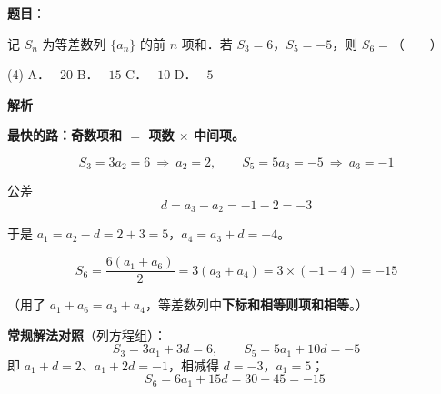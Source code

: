 \begin{answer}

\textbf{题目}：

记 $S_n$ 为等差数列 $\{a_n\}$ 的前 $n$ 项和．若 $S_3=6$，$S_5=-5$，则 $S_6=$\mbox{（　　）}

\begin{gkopts}(4)
\task A．$-20$
\task B．$-15$
\task C．$-10$
\task D．$-5$
\end{gkopts}

\textbf{解析}

\textbf{最快的路：奇数项和 $=$ 项数 $\times$ 中间项。}

\nopagebreak[4]
\[S_3=3a_2=6\ \Longrightarrow\ a_2=2,\qquad S_5=5a_3=-5\ \Longrightarrow\ a_3=-1\]

公差
\nopagebreak[4]
\[d=a_3-a_2=-1-2=-3\]

于是 $a_1=a_2-d=2+3=5$，$a_4=a_3+d=-4$。

\nopagebreak[4]
\[S_6=\frac{6\left(a_1+a_6\right)}{2}=3\left(a_3+a_4\right)=3\times(-1-4)=-15\]

（用了 $a_1+a_6=a_3+a_4$，等差数列中\textbf{下标和相等则项和相等}。）

\begin{gktip}
\textbf{常规解法对照}（列方程组）：
\nopagebreak[4]
\[S_3=3a_1+3d=6,\qquad S_5=5a_1+10d=-5\]
即 $a_1+d=2$、$a_1+2d=-1$，相减得 $d=-3$，$a_1=5$；
\nopagebreak[4]
\[S_6=6a_1+15d=30-45=-15\ \]
\end{gktip}


\par\medskip

\end{answer}
